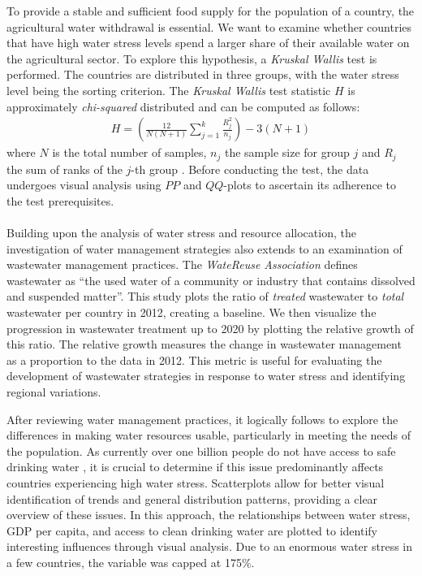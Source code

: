 \documentclass{article}
\theoremstyle{plain}
\theoremstyle{definition}
\theoremstyle{remark}
\begin{document}
To provide a stable and sufficient food supply for the population of a country, the agricultural water withdrawal is essential. We want to examine whether countries that have high water stress levels spend a larger share of their available water on the agricultural sector. To explore this hypothesis, a \textit{Kruskal Wallis} test is performed. The countries are distributed in three groups, with the water stress level being the sorting criterion. The \textit{Kruskal Wallis} test statistic $H$ is approximately \textit{chi-squared} distributed and can be computed as follows:
\begin{align}
    H = \left(\frac{12}{N(N+1)} \sum_{j = 1}^k \frac{R_j^2}{n_j}\right) -3(N+1)
\end{align}
where $N$ is the total number of samples, $n_j$ the sample size for group $j$ and $R_j$ the sum of ranks of the $j$-th group \cite{Ostertagova2014}.
Before conducting the test, the data undergoes visual analysis using $PP$ and $QQ$-plots to ascertain its adherence to the test prerequisites.\\\\
Building upon the analysis of water stress and resource allocation, the investigation of water management strategies also extends to an examination of wastewater management practices. The \textit{WateReuse Association} defines wastewater as “the used water of a community or industry that contains dissolved and suspended matter”.
This study plots the ratio of \textit{treated} wastewater to \textit{total} wastewater per country in 2012, creating a baseline. We then visualize the progression in wastewater treatment up to 2020 by plotting the relative growth of this ratio. The relative growth measures the change in wastewater management as a proportion to the data in 2012. This metric is useful for evaluating the development of wastewater strategies in response to water stress and identifying regional variations.

After reviewing water management practices, it logically follows to explore the differences in making water resources usable, particularly in meeting the needs of the population.
As currently over one billion people do not have access to safe drinking water \cite{Programme2023}, it is crucial to determine if this issue predominantly affects countries experiencing high water stress.
Scatterplots allow for better visual identification of trends and general distribution patterns, providing a clear overview of these issues.
In this approach, the relationships between water stress, GDP per capita, and access to clean drinking water are plotted to identify interesting influences through visual analysis. 
Due to an enormous water stress in a few countries, the variable was capped at 175\%.
\end{document}
